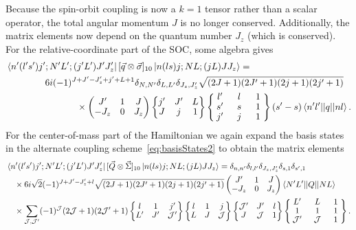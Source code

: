 Because the spin-orbit coupling is now a $k=1$ tensor rather than a scalar operator, the total angular momentum $J$ is no longer conserved. Additionally, the matrix elements now depend on the quantum number $J_z$ (which is conserved). For the relative-coordinate part of the SOC, some algebra gives
\begin{equation}\begin{split}
&\bra{n'(l's')j';N'L';(j'L')J'J'_z}  [ \vec{q} \otimes \vec{\sigma} ]_{10}  \ket{n(ls)j;NL;(jL)JJ_z} = \\
&\hspace{1.5cm} 6 i (-1)^{J+J'-J'_z+j'+L+1}\delta_{N,N'}\delta_{L,L'}\delta_{J_z,J'_z} \sqrt{(2J+1)(2J'+1)(2j+1)(2j'+1)} \\
 &\hspace{2.7cm} \times \threej{J'}{1}{J}{-J_z}{0}{J_z} \sixj{j'}{J'}{L}{J}{j}{1}
 \renewcommand{\arraystretch}{0.9}
 \ninej{\hphantom{l}l'\hphantom{l}}{\hphantom{l}l\hphantom{l}}{\hphantom{l}1\hphantom{l}}{s'}{s}{1}{j'}{j}{1} (s'-s) \braket{n'l' || q || n l}.
\end{split}
\end{equation}
For the center-of-mass part of the Hamiltonian we again expand the basis states in the alternate coupling scheme~\eqref{eq:basisStates2} to obtain the matrix elements
\begin{equation}\begin{split}
&\bra{n'(l's')j';N'L';(j'L')J'J'_z} [ \vec{Q} \otimes \vec{\Sigma} ]_{10}  \ket{n(ls)j;NL;(jL)JJ_z} = \delta_{n,n'}\delta_{l,l'}\delta_{J_z,J'_z}\delta_{s,1}\delta_{s',1} \\
 &\quad\times 6 i \sqrt{2}(-1)^{J+J'-J'_z+l} \sqrt{(2J+1)(2J'+1)(2j+1)(2j'+1)} \threej{J'}{1}{J}{-J_z}{0}{J_z}  \braket{N' L' || Q || N L} \\ 
 &\quad\times\sum_{\mathcal{J},\mathcal{J}'} (-1)^\mathcal{J}(2\mathcal{J}+1)(2\mathcal{J}'+1)\sixj{l}{1}{j'}{L'}{J'}{\mathcal{J}'}\sixj{l}{1}{j}{L}{J}{\mathcal{J}}\sixj{\mathcal{J}'}{J'}{l}{J}{\mathcal{J}}{1}
 \renewcommand{\arraystretch}{0.9}
 \ninej{\hphantom{l}L'\hphantom{l}}{\hphantom{l}L\hphantom{l}}{\hphantom{l}1\hphantom{l}}{1}{1}{1}{\mathcal{J}'}{\mathcal{J}}{1} .
\end{split}
\end{equation}

